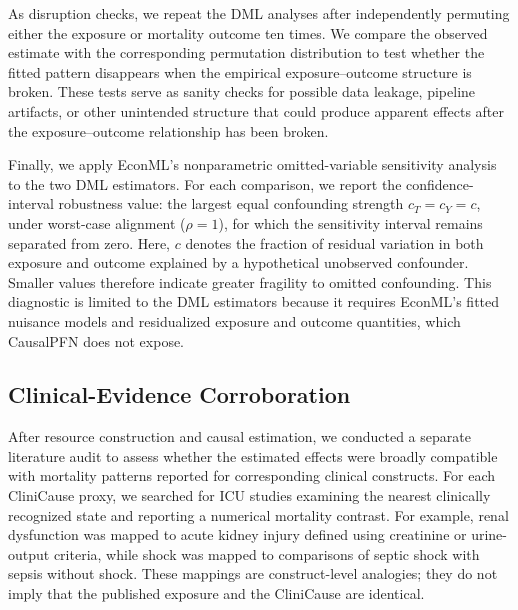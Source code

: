 \documentclass[letterpaper]{article}
\begin{document}
As disruption checks, we repeat the DML analyses after independently permuting
either the exposure or mortality outcome ten times. We compare the observed
estimate with the corresponding permutation distribution to test whether the
fitted pattern disappears when the empirical exposure--outcome structure is
broken. These tests serve as sanity checks for possible data leakage,
pipeline artifacts, or other unintended structure that could produce apparent
effects after the exposure--outcome relationship has been broken.

Finally, we apply EconML's nonparametric omitted-variable sensitivity analysis
to the two DML estimators. For each comparison, we report the confidence-interval
robustness value: the largest equal confounding strength
\(c_T=c_Y=c\), under worst-case alignment (\(\rho=1\)), for which the
sensitivity interval remains separated from zero. Here, \(c\) denotes the
fraction of residual variation in both exposure and outcome explained by a
hypothetical unobserved confounder. Smaller values therefore indicate greater
fragility to omitted confounding. This diagnostic is
limited to the DML estimators because it requires EconML's fitted nuisance
models and residualized exposure and outcome quantities, which CausalPFN does
not expose.



\subsection{Clinical-Evidence Corroboration}\label{sec:4-clinicalcorrob}

After resource construction and causal estimation, we conducted a separate
literature audit to assess whether the estimated effects were broadly compatible
with mortality patterns reported for corresponding clinical constructs. For
each CliniCause proxy, we searched for ICU studies examining the nearest
clinically recognized state and reporting a numerical mortality contrast. For
example, renal dysfunction was mapped to acute kidney injury defined using
creatinine or urine-output criteria, while shock was mapped to comparisons of
septic shock with sepsis without shock. These mappings are construct-level
analogies; they do not imply that the published exposure and the CliniCause are identical.
\end{document}
